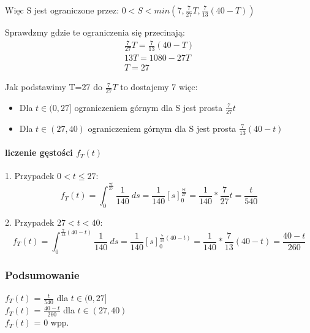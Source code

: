 \documentclass[12pt,a4paper]{article}
\begin{document}
Więc S jest ograniczone przez: $0 < S < min(7, \frac{7}{27}T, \frac{7}{13}(40 - T))$

Sprawdzmy gdzie te ograniczenia się przecinają:
\begin{gather*}
\frac{7}{27}T = \frac{7}{13}(40 - T) \\
13T = 1080 - 27T \\
T = 27
\end{gather*}

Jak podstawimy T=27 do $\frac{7}{27}T$ to dostajemy 7 więc:
\begin{itemize}
    \item Dla $t \in (0, 27]$ ograniczeniem górnym dla S jest prosta $\frac{7}{27}t$
    \item Dla $t \in (27, 40)$ ograniczeniem górnym dla S jest prosta $\frac{7}{13}(40 - t)$
\end{itemize}

\paragraph*{liczenie gęstości $f_T(t)$}
1. Przypadek $ 0 < t \leq 27 $:
$$
f_T(t) =
\int_0^\frac{7t}{27} \frac{1}{140} \ ds =
\frac{1}{140} [s]_0^\frac{7t}{27} =
\frac{1}{140} * \frac{7}{27}t = \frac{t}{540}
$$

2. Przypadek $ 27 < t < 40 $:
$$
f_T(t) = 
\int_0^{\frac{7}{13}(40 - t)} \frac{1}{140} \ ds = 
\frac{1}{140} [s]_0^{\frac{7}{13}(40 - t)} = 
\frac{1}{140} * \frac{7}{13}(40 - t) = \frac{40 - t}{260}
$$

\subsubsection*{Podsumowanie}
$f_T(t)$ = $\frac{t}{540} $ dla $ t \in (0, 27] $\\
$f_T(t)$ = $\frac{40 - t}{260} $ dla $ t \in (27, 40) $\\
$f_T(t)$ = 0 wpp.
\end{document}
